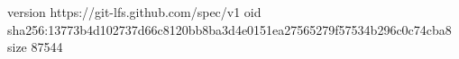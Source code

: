 version https://git-lfs.github.com/spec/v1
oid sha256:13773b4d102737d66c8120bb8ba3d4e0151ea27565279f57534b296c0c74cba8
size 87544
